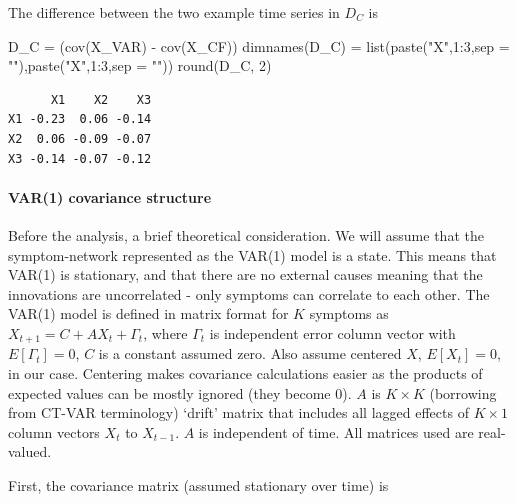 \documentclass[
  letterpaper,
  DIV=11,
  numbers=noendperiod]{scrartcl}
\let\oldparagraph\paragraph
\renewcommand{\paragraph}[1]{\oldparagraph{#1}\mbox{}}
\newenvironment{Shaded}{\begin{snugshade}}{\end{snugshade}}
\newcommand{\AttributeTok}[1]{\textcolor[rgb]{0.40,0.45,0.13}{#1}}
\newcommand{\DecValTok}[1]{\textcolor[rgb]{0.68,0.00,0.00}{#1}}
\newcommand{\FunctionTok}[1]{\textcolor[rgb]{0.28,0.35,0.67}{#1}}
\newcommand{\NormalTok}[1]{\textcolor[rgb]{0.00,0.23,0.31}{#1}}
\newcommand{\OtherTok}[1]{\textcolor[rgb]{0.00,0.23,0.31}{#1}}
\newcommand{\SpecialCharTok}[1]{\textcolor[rgb]{0.37,0.37,0.37}{#1}}
\newcommand{\StringTok}[1]{\textcolor[rgb]{0.13,0.47,0.30}{#1}}
\begin{document}
The difference between the two example time series in \(D_C\) is

\begin{Shaded}
\begin{Highlighting}[]
\NormalTok{D\_C }\OtherTok{=}\NormalTok{ (}\FunctionTok{cov}\NormalTok{(X\_VAR) }\SpecialCharTok{{-}} \FunctionTok{cov}\NormalTok{(X\_CF))}
\FunctionTok{dimnames}\NormalTok{(D\_C) }\OtherTok{=} \FunctionTok{list}\NormalTok{(}\FunctionTok{paste}\NormalTok{(}\StringTok{"X"}\NormalTok{,}\DecValTok{1}\SpecialCharTok{:}\DecValTok{3}\NormalTok{,}\AttributeTok{sep =} \StringTok{""}\NormalTok{),}\FunctionTok{paste}\NormalTok{(}\StringTok{"X"}\NormalTok{,}\DecValTok{1}\SpecialCharTok{:}\DecValTok{3}\NormalTok{,}\AttributeTok{sep =} \StringTok{""}\NormalTok{))}
\FunctionTok{round}\NormalTok{(D\_C, }\DecValTok{2}\NormalTok{)}
\end{Highlighting}
\end{Shaded}

\begin{verbatim}
      X1    X2    X3
X1 -0.23  0.06 -0.14
X2  0.06 -0.09 -0.07
X3 -0.14 -0.07 -0.12
\end{verbatim}

\hypertarget{var1-covariance-structure}{%
\paragraph{VAR(1) covariance
structure}\label{var1-covariance-structure}}

Before the analysis, a brief theoretical consideration. We will assume
that the symptom-network represented as the VAR(1) model is a state.
This means that VAR(1) is stationary, and that there are no external
causes meaning that the innovations are uncorrelated - only symptoms can
correlate to each other. The VAR(1) model is defined in matrix format
for \(K\) symptoms as \(X_{t+1}=C+AX_{t}+\Gamma_t\), where \(\Gamma_t\)
is independent error column vector with \(E[\Gamma_t]=0\), \(C\) is a
constant assumed zero. Also assume centered \(X\), \(E[X_t]=0\), in our
case. Centering makes covariance calculations easier as the products of
expected values can be mostly ignored (they become 0). \(A\) is
\(K \times K\) (borrowing from CT-VAR terminology) `drift' matrix that
includes all lagged effects of \(K\times1\) column vectors \(X_t\) to
\(X_{t-1}\). \(A\) is independent of time. All matrices used are
real-valued.

First, the covariance matrix (assumed stationary over time) is
\end{document}
